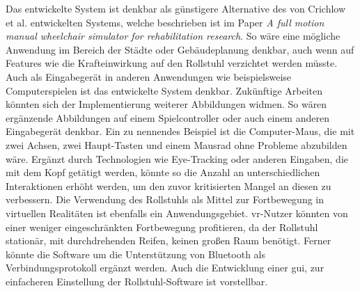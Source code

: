 Das entwickelte System ist denkbar als günstigere Alternative des von Crichlow et al. entwickelten Systems, welche beschrieben ist im Paper \textit{A full motion manual
    wheelchair simulator for rehabilitation research}\cite{crichlowFullMotionManual2011}.
So wäre eine mögliche Anwendung im Bereich der Städte oder Gebäudeplanung denkbar, auch wenn auf Features wie die Krafteinwirkung auf den Rollstuhl verzichtet werden müsste.
Auch als Eingabegerät in anderen Anwendungen wie beispielsweise Computerspielen ist das entwickelte System denkbar.
Zukünftige Arbeiten könnten sich der Implementierung weiterer Abbildungen widmen.
So wären ergänzende Abbildungen auf einem Spielcontroller oder auch einem anderen Eingabegerät denkbar.
Ein zu nennendes Beispiel ist die Computer-Maus, die mit zwei Achsen, zwei Haupt-Tasten und einem Mausrad ohne Probleme abzubilden wäre.
Ergänzt durch Technologien wie Eye-Tracking oder anderen Eingaben, die mit dem Kopf getätigt werden, könnte so die Anzahl an unterschiedlichen Interaktionen erhöht werden, um den zuvor kritisierten Mangel an diesen zu verbessern.
Die Verwendung des Rollstuhls als Mittel zur Fortbewegung in virtuellen Realitäten ist ebenfalls ein Anwendungsgebiet.
\ac{vr}-Nutzer könnten von einer weniger eingeschränkten Fortbewegung profitieren, da der Rollstuhl stationär, mit durchdrehenden Reifen, keinen großen Raum benötigt.
Ferner könnte die Software um die Unterstützung von Bluetooth als Verbindungsprotokoll ergänzt werden.
Auch die Entwicklung einer \ac{gui}, zur einfacheren Einstellung der Rollstuhl-Software ist vorstellbar.

\newpage